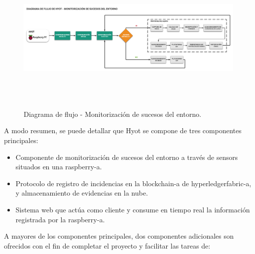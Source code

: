 \documentclass[12pt,a4paper, twoside]{report}
\begin{document}
		\begin{figure}[!ht]   
			\caption{Diagrama de flujo - Monitorización de sucesos del entorno.} 
			\begin{center} 
	 			\includegraphics[width=18cm,height=6.7cm]{Images/implement/hyot_flow} \\
				\label{fig:hyot_flow} 
			\end{center}  
		\end{figure}

	A modo resumen, se puede detallar que Hyot se compone de tres componentes principales:

	\begin{itemize}
  		\item Componente de monitorización de sucesos del entorno a través de \glspl{sensor} situados en una \gls{raspberry-a}.
  		\item Protocolo de registro de incidencias en la \gls{blockchain-a} de \gls{hyperledgerfabric-a}, y almacenamiento de evidencias en la nube. 
  		\item Sistema web que actúa como cliente y consume en tiempo real la información registrada por la \gls{raspberry-a}.
	\end{itemize}

	A mayores de los componentes principales, dos componentes adicionales son ofrecidos con el fin de completar el proyecto y facilitar las tareas de:
\end{document}
